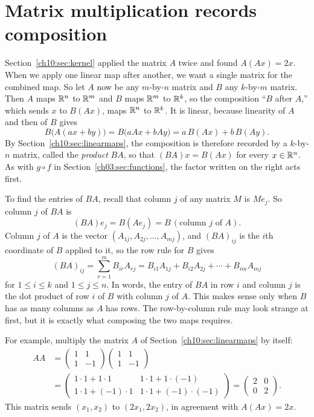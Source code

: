 \section{Matrix multiplication records composition}\label{ch10:sec:product}
Section~\ref{ch10:sec:kernel} applied the matrix $A$ twice and found $A(Ax)=2x$. When we apply one linear map after another, we want a single matrix for the combined map. So let $A$ now be any $m$-by-$n$ matrix and $B$ any $k$-by-$m$ matrix. Then $A$ maps $\mathbb R^n$ to $\mathbb R^m$ and $B$ maps $\mathbb R^m$ to $\mathbb R^k$, so the composition ``$B$ after $A$,'' which sends $x$ to $B(Ax)$, maps $\mathbb R^n$ to $\mathbb R^k$. It is linear, because linearity of $A$ and then of $B$ gives
\[
B\bigl(A(ax+by)\bigr)=B\bigl(aAx+bAy\bigr)=a\,B(Ax)+b\,B(Ay).
\]
By Section~\ref{ch10:sec:linearmaps}, the composition is therefore recorded by a $k$-by-$n$ matrix, called the \emph{product} $BA$, so that $(BA)x=B(Ax)$ for every $x\in\mathbb R^n$. As with $g\circ f$ in Section~\ref{ch03:sec:functions}, the factor written on the right acts first.

To find the entries of $BA$, recall that column $j$ of any matrix $M$ is $Me_j$. So column $j$ of $BA$ is
\[
(BA)e_j=B(Ae_j)=B\,(\text{column $j$ of $A$}).
\]
Column $j$ of $A$ is the vector $(A_{1j},A_{2j},\ldots,A_{mj})$, and $(BA)_{ij}$ is the $i$th coordinate of $B$ applied to it, so the row rule for $B$ gives
\[
(BA)_{ij}=\sum_{r=1}^m B_{ir}A_{rj}=B_{i1}A_{1j}+B_{i2}A_{2j}+\cdots+B_{im}A_{mj}
\]
for $1\le i\le k$ and $1\le j\le n$. In words, the entry of $BA$ in row $i$ and column $j$ is the dot product of row $i$ of $B$ with column $j$ of $A$. This makes sense only when $B$ has as many columns as $A$ has rows. The row-by-column rule may look strange at first, but it is exactly what composing the two maps requires.

For example, multiply the matrix $A$ of Section~\ref{ch10:sec:linearmaps} by itself:
\begin{align*}
AA&=\begin{pmatrix}1&1\\1&-1\end{pmatrix}\begin{pmatrix}1&1\\1&-1\end{pmatrix}\\
&=\begin{pmatrix}1\cdot1+1\cdot1&1\cdot1+1\cdot(-1)\\1\cdot1+(-1)\cdot1&1\cdot1+(-1)\cdot(-1)\end{pmatrix}
=\begin{pmatrix}2&0\\0&2\end{pmatrix}.
\end{align*}
This matrix sends $(x_1,x_2)$ to $(2x_1,2x_2)$, in agreement with $A(Ax)=2x$.

